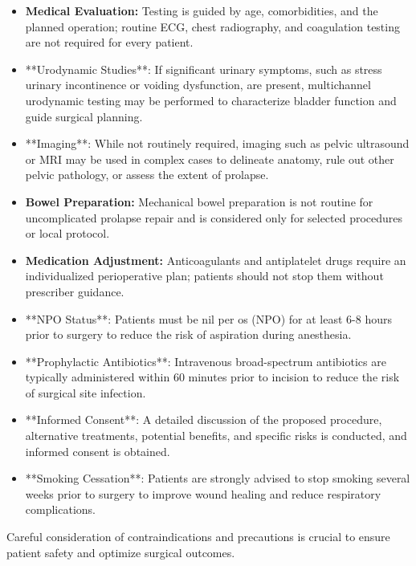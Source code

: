 \begin{itemize}
  \item \textbf{Medical Evaluation:} Testing is guided by age, comorbidities, and the planned operation; routine ECG, chest radiography, and coagulation testing are not required for every patient.
  
  \item **Urodynamic Studies**: If significant urinary symptoms, such as stress urinary incontinence or voiding dysfunction, are present, multichannel urodynamic testing may be performed to characterize bladder function and guide surgical planning.
  
  \item **Imaging**: While not routinely required, imaging such as pelvic ultrasound or MRI may be used in complex cases to delineate anatomy, rule out other pelvic pathology, or assess the extent of prolapse.
  
  \item \textbf{Bowel Preparation:} Mechanical bowel preparation is not routine for uncomplicated prolapse repair and is considered only for selected procedures or local protocol.
  
  \item \textbf{Medication Adjustment:} Anticoagulants and antiplatelet drugs require an individualized perioperative plan; patients should not stop them without prescriber guidance.
  
  \item **NPO Status**: Patients must be nil per os (NPO) for at least 6-8 hours prior to surgery to reduce the risk of aspiration during anesthesia.
  
  \item **Prophylactic Antibiotics**: Intravenous broad-spectrum antibiotics are typically administered within 60 minutes prior to incision to reduce the risk of surgical site infection.
  
  \item **Informed Consent**: A detailed discussion of the proposed procedure, alternative treatments, potential benefits, and specific risks is conducted, and informed consent is obtained.
  
  \item **Smoking Cessation**: Patients are strongly advised to stop smoking several weeks prior to surgery to improve wound healing and reduce respiratory complications.
\end{itemize}

Careful consideration of contraindications and precautions is crucial to ensure patient safety and optimize surgical outcomes.


